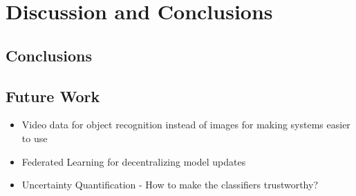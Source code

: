 
\chapter{Discussion and Conclusions}
\label{chap:discussion_and_conclusions}
\noindent %

\section{Conclusions}
\label{sec:conclusions}

\section{Future Work}

\begin{itemize}
	\item Video data for object recognition instead of images for making systems easier to use
	\item Federated Learning for decentralizing model updates 
	\item Uncertainty Quantification - How to make the classifiers trustworthy?
\end{itemize}


